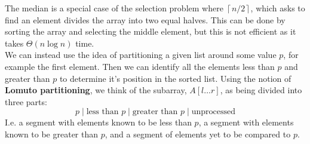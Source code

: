 \documentclass[12pt letter]{report}
\begin{document}

The median is a special case of the selection problem where $\left\lceil n / 2 \right\rceil $, which asks to find an
element divides the array into two equal halves. This can be done by sorting the array and selecting the middle element,
but this is not efficient as it takes $\Theta \left( n \log n \right) $ time.\\
We can instead use the idea of partitioning a given list around some value $p$, for example the first element. Then we
can identify all the elements less than $p$ and greater than $p$ to determine it's position in the sorted list. Using
the notion of \textbf{Lomuto partitioning}, we think of the subarray, $A \left[ l \ldots r \right] $, as being divided into three parts:
\[
  p \mid \text{less than $p$} \mid \text{greater than $p$} \mid \text{unprocessed}
\]
I.e. a segment with elements known to be less than $p$, a segment with elements known to be greater than $p$, and a
segment of elements yet to be compared to $p$.
\end{document}
